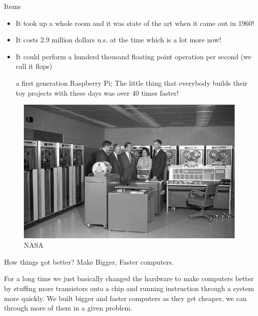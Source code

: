 \documentclass{beamer}
\begin{document}
\begin{frame}
\begin{block}{Items}
\begin{itemize}
\item <1-> \small It took up a whole room and it was state of the art when it came out in 1960!
\item<2-> \small  It costs 2.9 million dollars u.s. at the time which is a lot more now!
\item<3->\small It could perform a hunderd thousand floating point operation per second (we call it flops)
 { \begin{alertblock}{}
{\small a first generation Raspberry Pi; The little thing that everybody builds their toy projects with these days was over 40 times faster!}
\end{alertblock}}
\end{itemize}
\end{block}
\begin{figure}
\includegraphics[scale=0.2]{Figures/ibm7090nasa.jpg}
 \caption{NASA}
\end{figure}
\end {frame}


\begin{frame}
\begin{block}{How things got better?}
 Make Bigger, Faster computers.
\end{block}
For a long time we just basically changed the hardware to make computers better by stuffing more transistors onto a chip and running instruction through a system more quickly. We built bigger and faster computers as they get cheaper, we can through more of them in a given problem.
\end {frame}
\end{document}

